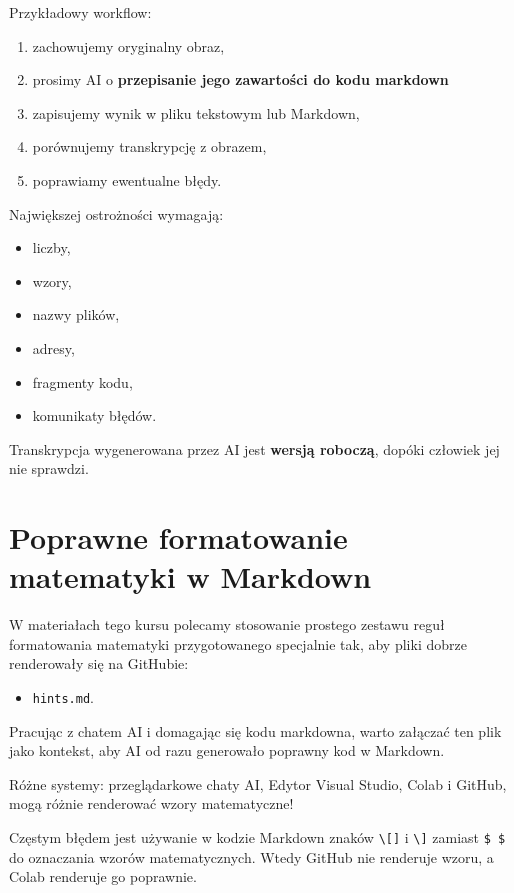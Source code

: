 \documentclass[12pt, a4paper]{article}
\begin{document}
Przykładowy workflow:
\begin{enumerate}
\item zachowujemy oryginalny obraz,
\item prosimy AI o \textbf{przepisanie jego zawartości do kodu markdown}
\item zapisujemy wynik w pliku tekstowym lub Markdown,
\item porównujemy transkrypcję z obrazem,
\item poprawiamy ewentualne błędy.
\end{enumerate}Największej ostrożności wymagają:
\begin{itemize}
\item liczby,
\item wzory,
\item nazwy plików,
\item adresy,
\item fragmenty kodu,
\item komunikaty błędów.
\end{itemize}
Transkrypcja wygenerowana przez AI jest \textbf{wersją roboczą}, dopóki człowiek jej nie sprawdzi.

\section{Poprawne formatowanie matematyki w Markdown}
W materiałach tego kursu polecamy stosowanie prostego zestawu reguł formatowania matematyki przygotowanego specjalnie tak, aby pliki dobrze renderowały się na GitHubie: 
\begin{itemize}
    \item \texttt{hints.md}. 
\end{itemize}
 Pracując z chatem AI i domagając się kodu markdowna, warto załączać ten plik jako kontekst, aby AI od razu generowało poprawny kod w Markdown. 
 
 Różne systemy: przeglądarkowe chaty AI, Edytor Visual Studio, Colab i GitHub, mogą różnie renderować wzory matematyczne!

Częstym błędem jest używanie w kodzie Markdown znaków \verb|\[]| i \verb|\]| zamiast \verb|$ $| do oznaczania wzorów matematycznych. Wtedy GitHub nie renderuje wzoru, a Colab renderuje go poprawnie.
\end{document}
